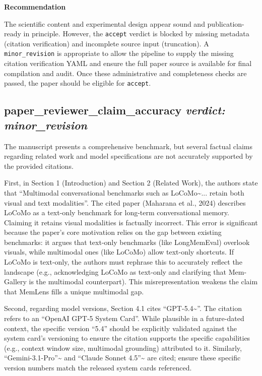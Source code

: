 \documentclass{llmxive}
\begin{document}
\medskip\noindent\textbf{Recommendation}\par\medskip\noindent
The scientific content and experimental design appear sound and publication-ready in principle. However, the \texttt{accept} verdict is blocked by missing metadata (citation verification) and incomplete source input (truncation). A \texttt{minor\_revision} is appropriate to allow the pipeline to supply the missing citation verification YAML and ensure the full paper source is available for final compilation and audit. Once these administrative and completeness checks are passed, the paper should be eligible for \texttt{accept}.

\bigskip

\subsection*{paper\_reviewer\_claim\_accuracy \hfill \textit{verdict: minor\_revision}}
The manuscript presents a comprehensive benchmark, but several factual claims regarding related work and model specifications are not accurately supported by the provided citations.

First, in Section 1 (Introduction) and Section 2 (Related Work), the authors state that ``Multimodal conversational benchmarks such as LoCoMo\textasciitilde{}\cite{maharana2024evaluatinglongtermconversationalmemory}... retain both visual and text modalities''. The cited paper (Maharana et al., 2024) describes LoCoMo as a text-only benchmark for long-term conversational memory. Claiming it retains visual modalities is factually incorrect. This error is significant because the paper's core motivation relies on the gap between existing benchmarks: it argues that text-only benchmarks (like LongMemEval) overlook visuals, while multimodal ones (like LoCoMo) allow text-only shortcuts. If LoCoMo is text-only, the authors must rephrase this to accurately reflect the landscape (e.g., acknowledging LoCoMo as text-only and clarifying that Mem-Gallery is the multimodal counterpart). This misrepresentation weakens the claim that MemLens fills a unique multimodal gap.

Second, regarding model versions, Section 4.1 cites ``GPT-5.4\textasciitilde{}\citep{singh2025openaigpt5card}''. The citation refers to an ``OpenAI GPT-5 System Card''. While plausible in a future-dated context, the specific version ``5.4'' should be explicitly validated against the system card's versioning to ensure the citation supports the specific capabilities (e.g., context window size, multimodal grounding) attributed to it. Similarly, ``Gemini-3.1-Pro''\textasciitilde{}\citep{googledeepmind2026gemini31pro} and ``Claude Sonnet 4.5''\textasciitilde{}\citep{anthropic2025claudesonnet45card} are cited; ensure these specific version numbers match the released system cards referenced.
\end{document}
